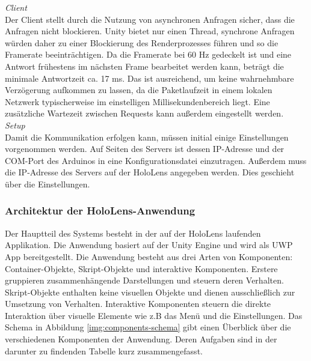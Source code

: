 \textit{Client}\\
Der Client stellt durch die Nutzung von asynchronen Anfragen sicher, dass die Anfragen nicht blockieren. Unity bietet nur einen Thread, synchrone Anfragen würden daher zu einer Blockierung des Renderprozesses führen und so die Framerate beeinträchtigen. Da die Framerate bei 60 Hz gedeckelt ist und eine Antwort frühestens im nächsten Frame bearbeitet werden kann, beträgt die minimale Antwortzeit ca. 17 ms. Das ist ausreichend, um keine wahrnehmbare Verzögerung aufkommen zu lassen, da die Paketlaufzeit in einem lokalen Netzwerk typischerweise im einstelligen Millisekundenbereich liegt. Eine zusätzliche Wartezeit zwischen Requests kann außerdem eingestellt werden.\\

\textit{Setup}\\
Damit die Kommunikation erfolgen kann, müssen initial einige Einstellungen vorgenommen werden. Auf Seiten des Servers ist dessen IP-Adresse und der COM-Port des Arduinos in eine Konfigurationsdatei einzutragen. Außerdem muss die IP-Adresse des Servers auf der HoloLens angegeben werden. Dies geschieht über die Einstellungen.

\subsubsection{Architektur der HoloLens-Anwendung}
\label{sec-5-1-2}
Der Hauptteil des Systems besteht in der auf der HoloLens laufenden Applikation. Die Anwendung basiert auf der Unity Engine und wird als UWP App bereitgestellt. Die Anwendung besteht aus drei Arten von Komponenten: Container-Objekte, Skript-Objekte und interaktive Komponenten. Erstere gruppieren zusammenhängende Darstellungen und steuern deren Verhalten. Skript-Objekte enthalten keine visuellen Objekte und dienen ausschließlich zur Umsetzung von Verhalten. Interaktive Komponenten steuern die direkte Interaktion über visuelle Elemente wie z.B das Menü und die Einstellungen. Das Schema in Abbildung \ref{img:components-schema} gibt einen Überblick über die verschiedenen Komponenten der Anwendung. Deren Aufgaben sind in der darunter zu findenden Tabelle kurz zusammengefasst.

